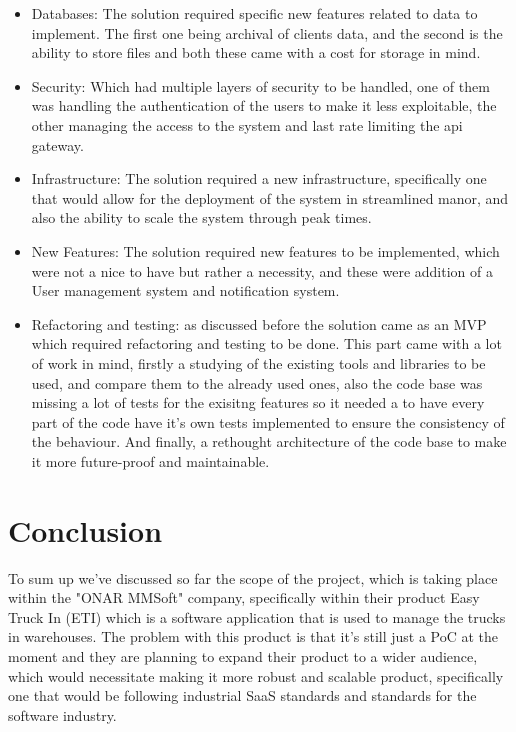 \begin{itemize}
    \item Databases: The solution required specific new features related to data
        to implement. The first one being archival of clients data,
        and the second is the ability to store files and both these
        came with a cost for storage in mind.
    \item Security: Which had multiple layers of security to be handled,
        one of them was handling the authentication of the users to make it
        less exploitable, the other managing the access to the system and
        last rate limiting the api gateway.
    \item Infrastructure: The solution required a new infrastructure, specifically
        one that would allow for the deployment of the system in streamlined
        manor, and also the ability to scale the system through peak times.
    \item New Features: The solution required new features to be implemented,
        which were not a nice to have but rather a necessity, and these were
        addition of a User management system and notification system.
    \item Refactoring and testing: as discussed before the solution came as an
        MVP which required refactoring and testing to be done.
        This part came with a lot of work in mind, firstly a studying of the
        existing tools and libraries to be used, and compare them to the already
        used ones, also the code base was missing a lot of tests for the exisitng
        features so it needed a to have every part of the code have it's own
        tests implemented to ensure the consistency of the behaviour.
        And finally, a rethought architecture of the code base to make it 
        more future-proof and maintainable.
\end{itemize}

\section{Conclusion}

To sum up we've discussed so far the scope of the project, which is taking place
within the "ONAR MMSoft" company, specifically within their product Easy Truck In (ETI)
which is a software application that is used to manage the trucks in warehouses.
The problem with this product is that it's still just a PoC at the moment and they 
are planning to expand their product to a wider audience, which would necessitate 
making it more robust and scalable product, specifically one that would be following
industrial SaaS standards and standards for the software industry.
